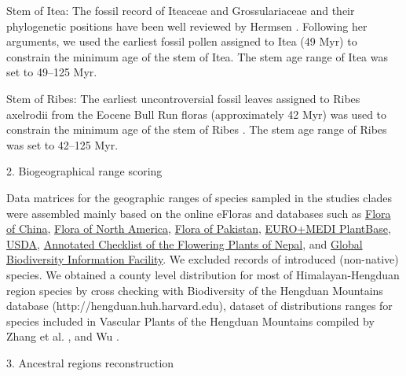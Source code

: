 \documentclass[10pt]{article}
\begin{document}
Stem of Itea: The fossil record of Iteaceae and Grossulariaceae and
their phylogenetic positions have been well reviewed by Hermsen
\citep{Hermsen2013}. Following her arguments, we used the earliest
fossil pollen assigned to Itea (49 Myr) to constrain the minimum age
of the stem of Itea. The stem age range of Itea was set to 49--125
Myr.

Stem of Ribes: The earliest uncontroversial fossil leaves assigned to
Ribes axelrodii from the Eocene Bull Run floras (approximately 42 Myr)
was used to constrain the minimum age of the stem of Ribes
\citep{Hermsen2005}. The stem age range of Ribes was set to 42--125
Myr.

2. Biogeographical range scoring

Data matrices for the geographic ranges of species sampled in the
studies clades were assembled mainly based on the online eFloras and
databases such as
\href{http://www.efloras.org/flora_page.aspx?flora_id=2}{Flora of
  China}, \href{http://floranorthamerica.org}{Flora of North America},
\href{http://www.efloras.org/flora_page.aspx?flora_id=5}{Flora of
  Pakistan}, \href{http://www.emplantbase.org}{EURO+MEDI PlantBase},
\href{http://plants.usda.gov}{USDA},
\href{http://www.efloras.org/flora_page.aspx?flora_id=110}{Annotated
  Checklist of the Flowering Plants of Nepal}, and
\href{http://www.gbif.org}{Global Biodiversity Information
  Facility}. We excluded records of introduced (non-native)
species. We obtained a county level distribution for most of
Himalayan-Hengduan region species by cross checking with Biodiversity
of the Hengduan Mountains database (http://hengduan.huh.harvard.edu),
dataset of distributions ranges for species included in Vascular
Plants of the Hengduan Mountains compiled by Zhang et
al. \citep{Zhang2009}, and Wu \citep{Wu2008}.

3. Ancestral regions reconstruction




\end{document}
